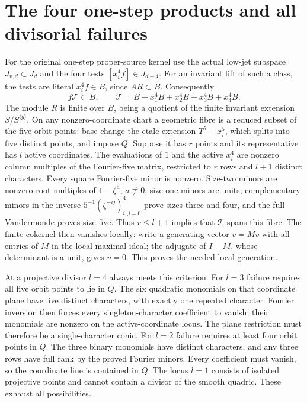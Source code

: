 \documentclass[11pt]{article}
\begin{document}
\section{The four one-step products and all divisorial failures}
For the original one-step proper-source kernel use the actual low-jet
subspace $J_{v,d}\subset J_d$ and the four tests $[x_i^4f]\in J_{d+4}$.
For an invariant lift of such a class, the tests are literal
$x_i^4f\in B$, since $AR\subset B$. Consequently
\[
 f\mathcal T\subset B,\qquad
 \mathcal T=B+x_1^4B+x_2^4B+x_3^4B+x_4^4B.                         \tag{CP5}
\]
The module $R$ is finite over $B$, being a quotient of the finite
invariant extension $S/S^{\langle g\rangle}$. On any nonzero-coordinate
chart a geometric fibre is a reduced subset of the five orbit points:
base change the etale extension $T^5-x_i^5$, which splits into
five distinct points, and impose $Q$. Suppose it has $r$ points
and its representative has $l$ active coordinates. The evaluations
of $1$ and the active $x_i^4$ are nonzero column multiples of the
Fourier-five matrix, restricted to $r$ rows and $l+1$ distinct
characters. Every square Fourier-five minor is nonzero. Size-two
minors are nonzero root multiples of $1-\zeta^a$, $a\not\equiv0$;
size-one minors are units; complementary minors in the inverse
$5^{-1}(\zeta^{-ij})_{i,j=0}^4$ prove sizes three and four, and the full
Vandermonde proves size five. Thus $r\le l+1$ implies that
$\mathcal T$ spans this fibre. The finite cokernel then vanishes
locally: write a generating vector $v=Mv$ with all entries of $M$
in the local maximal ideal; the adjugate of $I-M$, whose determinant
is a unit, gives $v=0$. This proves the needed local generation.

At a projective divisor $l=4$ always meets this criterion. For
$l=3$ failure requires all five orbit points to lie in $Q$. The
six quadratic monomials on that coordinate plane have five distinct
characters, with exactly one repeated character. Fourier inversion
then forces every singleton-character coefficient to vanish; their
monomials are nonzero on the active-coordinate locus. The plane
restriction must therefore be a single-character conic. For $l=2$
failure requires at least four orbit points in $Q$. The three binary
monomials have distinct characters, and any three rows have full
rank by the proved Fourier minors. Every coefficient must vanish,
so the coordinate line is contained in $Q$. The locus $l=1$ consists
of isolated projective points and cannot contain a divisor of the
smooth quadric. These exhaust all possibilities.
\end{document}
